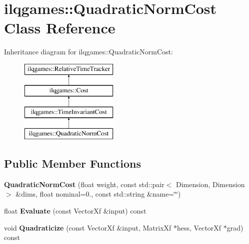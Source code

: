 \hypertarget{classilqgames_1_1_quadratic_norm_cost}{}\section{ilqgames\+:\+:Quadratic\+Norm\+Cost Class Reference}
\label{classilqgames_1_1_quadratic_norm_cost}
Inheritance diagram for ilqgames\+:\+:Quadratic\+Norm\+Cost\+:\begin{figure}[H]
\begin{center}
\leavevmode
\includegraphics[height=4.000000cm]{classilqgames_1_1_quadratic_norm_cost}
\end{center}
\end{figure}
\subsection*{Public Member Functions}
\begin{DoxyCompactItemize}
\item 
{\bfseries Quadratic\+Norm\+Cost} (float weight, const std\+::pair$<$ Dimension, Dimension $>$ \&dims, float nominal=0., const std\+::string \&name=\char`\"{}\char`\"{})\hypertarget{classilqgames_1_1_quadratic_norm_cost_a3a8704f72c0d6b4d968bd4e857d53c44}{}\label{classilqgames_1_1_quadratic_norm_cost_a3a8704f72c0d6b4d968bd4e857d53c44}

\item 
float {\bfseries Evaluate} (const Vector\+Xf \&input) const \hypertarget{classilqgames_1_1_quadratic_norm_cost_a627c6954a3c91608f09d54050b0c9a0d}{}\label{classilqgames_1_1_quadratic_norm_cost_a627c6954a3c91608f09d54050b0c9a0d}

\item 
void {\bfseries Quadraticize} (const Vector\+Xf \&input, Matrix\+Xf $\ast$hess, Vector\+Xf $\ast$grad) const \hypertarget{classilqgames_1_1_quadratic_norm_cost_af497480714a9fc5480983f28521d1ad0}{}\label{classilqgames_1_1_quadratic_norm_cost_af497480714a9fc5480983f28521d1ad0}

\end{DoxyCompactItemize}
